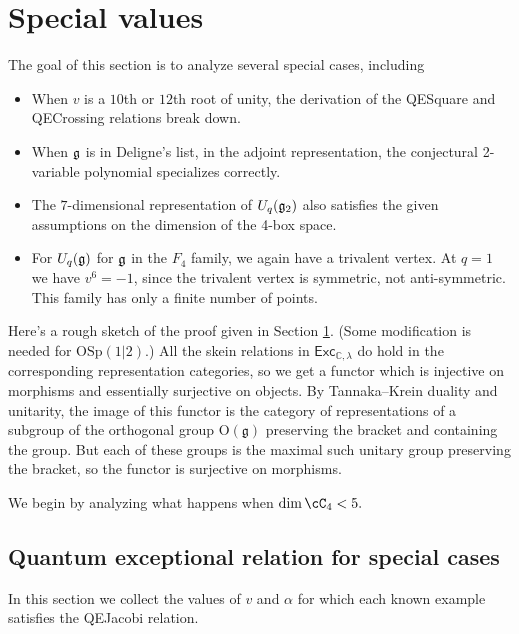\documentclass[12pt]{amsart}
\begin{document}
\section{Special values}
\label{sec:special-values}

The goal of this section is to analyze several special cases,
including
\begin{itemize}
\item When $v$ is a $10$th or $12$th root of unity, the
  derivation of the QESquare and QECrossing relations break down.
\item When ${\mathfrak g}$ is in Deligne's list, in the adjoint
  representation, the conjectural 2-variable polynomial specializes
  correctly.
\item The $7$-dimensional representation of $U_q({\mathfrak g}_2)$ also
  satisfies the given assumptions on the dimension of the 4-box space.
\item For $U_q({\mathfrak g})$ for ${\mathfrak g}$ in the $F_4$ family, we again have a
  trivalent vertex. At $q=1$ we have $v^6 = -1$, since the trivalent
  vertex is symmetric, not anti-symmetric. This family has only a
  finite number of points.
\end{itemize}

Here's a rough sketch of the proof given in Section \ref{sec:special-values}.
(Some modification is
needed for $\mathrm{OSp}(1|2)$.)  All the skein relations in
$\mathsf{Exc}_{\mathbb{C},\lambda}$ do hold in the corresponding
representation categories, so we get a functor which is injective on morphisms
and essentially surjective on objects.  By Tannaka--Krein duality and
unitarity, the image of this functor is the category of representations of a
subgroup of the orthogonal group $\mathrm{O}(\mathfrak{g})$ preserving the bracket and containing
the group.  But each of these groups is the maximal such unitary group
preserving the bracket, so the functor is surjective on morphisms.




We begin by analyzing what happens when $\dim \cC_4 < 5.$


\subsection{Quantum exceptional relation for special cases}

In this section we collect the values of $v$ and $\alpha$ for which each known example satisfies the QEJacobi relation.  
\end{document}
